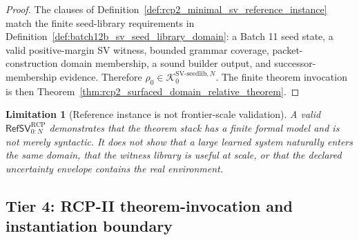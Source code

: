 \documentclass[11pt]{article}
\newtheorem{limitation}[theorem]{Limitation}
\newcommand{\1}{\mathbf{1}}
\newcommand{\RCP}{\mathrm{RCP}}
\providecommand{\Kcal}{\mathcal{K}}
\begin{document}
\begin{proof}
The clauses of Definition~\ref{def:rcp2_minimal_sv_reference_instance} match the finite seed-library requirements in Definition~\ref{def:batch12b_sv_seed_library_domain}: a Batch 11 seed state, a valid positive-margin SV witness, bounded grammar coverage, packet-construction domain membership, a sound builder output, and successor-membership evidence. Therefore \(\rho_0\in\Kcal_0^{\mathrm{SV\mbox{-}seedlib},N}\). The finite theorem invocation is then Theorem~\ref{thm:rcp2_surfaced_domain_relative_theorem}.
\end{proof}

\begin{limitation}[Reference instance is not frontier-scale validation]
\label{lim:rcp2_reference_instance_not_validation}
A valid \(\mathsf{RefSV}_{0:N}^{\RCP}\) demonstrates that the theorem stack has a finite formal model and is not merely syntactic. It does not show that a large learned system naturally enters the same domain, that the witness library is useful at scale, or that the declared uncertainty envelope contains the real environment.
\end{limitation}

\subsection{Tier 4: RCP-II theorem-invocation and instantiation boundary}
\end{document}
